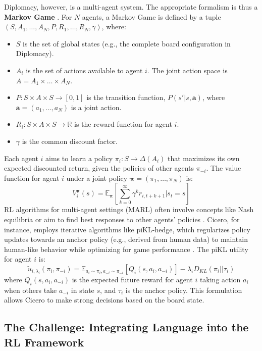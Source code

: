 \documentclass[oneside]{memoir}
\begin{document}
Diplomacy, however, is a multi-agent system. The appropriate formalism is thus a \textbf{Markov Game} \citep{Shapley1953StochasticG}. For $N$ agents, a Markov Game is defined by a tuple $(S, A_1, \dots, A_N, P, R_1, \dots, R_N, \gamma)$, where:
\begin{itemize}
    \item $S$ is the set of global states (e.g., the complete board configuration in Diplomacy).
    \item $A_i$ is the set of actions available to agent $i$. The joint action space is $A = A_1 \times \dots \times A_N$.
    \item $P: S \times A \times S \rightarrow [0,1]$ is the transition function, $P(s'|s, \mathbf{a})$, where $\mathbf{a} = (a_1, \dots, a_N)$ is a joint action.
    \item $R_i: S \times A \times S \rightarrow \mathbb{R}$ is the reward function for agent $i$.
    \item $\gamma$ is the common discount factor.
\end{itemize}
Each agent $i$ aims to learn a policy $\pi_i: S \rightarrow \Delta(A_i)$ that maximizes its own expected discounted return, given the policies of other agents $\pi_{-i}$. The value function for agent $i$ under a joint policy $\boldsymbol{\pi} = (\pi_1, \dots, \pi_N)$ is:
\[
V_i^{\boldsymbol{\pi}}(s) = \mathbb{E}_{\boldsymbol{\pi}} \left[ \sum_{k=0}^{\infty} \gamma^k r_{i, t+k+1} | s_t=s \right]
\]
RL algorithms for multi-agent settings (MARL) often involve concepts like Nash equilibria or aim to find best responses to other agents' policies \citep{Buoniu2008ACS}. Cicero, for instance, employs iterative algorithms like piKL-hedge, which regularizes policy updates towards an anchor policy (e.g., derived from human data) to maintain human-like behavior while optimizing for game performance \citep{meta2022human}. The piKL utility for agent $i$ is:
\[
\tilde{u}_{i,\lambda_{i}}(\pi_{i},\pi_{-i}) = \mathbb{E}_{a_i \sim \pi_i, a_{-i} \sim \pi_{-i}}[Q_i(s, a_i, a_{-i})] - \lambda_{i}D_{KL}(\pi_{i}||\tau_{i})
\]
where $Q_i(s, a_i, a_{-i})$ is the expected future reward for agent $i$ taking action $a_i$ when others take $a_{-i}$ in state $s$, and $\tau_i$ is the anchor policy. This formulation allows Cicero to make strong decisions based on the board state.

\subsection{The Challenge: Integrating Language into the RL Framework}
\end{document}
